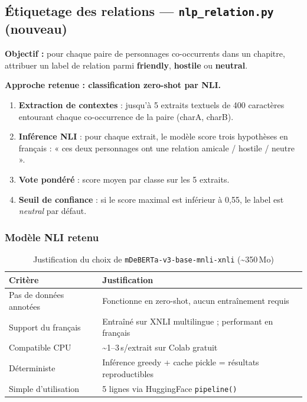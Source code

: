\documentclass[a4paper,11pt]{article}
\begin{document}
\subsection{Étiquetage des relations — \texttt{nlp\_relation.py} (nouveau)}

\textbf{Objectif :} pour chaque paire de personnages co-occurrents dans un chapitre, attribuer un
label de relation parmi \textcolor{friendly}{\textbf{friendly}}, \textcolor{hostile}{\textbf{hostile}}
ou \textcolor{neutral}{\textbf{neutral}}.

\textbf{Approche retenue : classification zero-shot par NLI.}

\begin{enumerate}[noitemsep]
  \item \textbf{Extraction de contextes} : jusqu'à 5 extraits textuels de 400 caractères entourant chaque
        co-occurrence de la paire (charA, charB).
  \item \textbf{Inférence NLI} : pour chaque extrait, le modèle score trois hypothèses en français :
        « ces deux personnages ont une relation amicale / hostile / neutre ».
  \item \textbf{Vote pondéré} : score moyen par classe sur les 5 extraits.
  \item \textbf{Seuil de confiance} : si le score maximal est inférieur à 0{,}55, le label est
        \textit{neutral} par défaut.
\end{enumerate}

\subsubsection*{Modèle NLI retenu}

\begin{table}[H]
  \centering
  \footnotesize
  \begin{tabular}{lp{9cm}}
    \toprule
    \textbf{Critère} & \textbf{Justification} \\
    \midrule
    Pas de données annotées & Fonctionne en zero-shot, aucun entraînement requis \\
    Support du français     & Entraîné sur XNLI multilingue ; performant en français \\
    Compatible CPU          & \textasciitilde{}1--3\,s/extrait sur Colab gratuit \\
    Déterministe            & Inférence greedy + cache pickle = résultats reproductibles \\
    Simple d'utilisation    & 5 lignes via HuggingFace \texttt{pipeline()} \\
    \bottomrule
  \end{tabular}
  \caption{Justification du choix de \texttt{mDeBERTa-v3-base-mnli-xnli} (\textasciitilde{}350\,Mo)}
\end{table}
\end{document}
